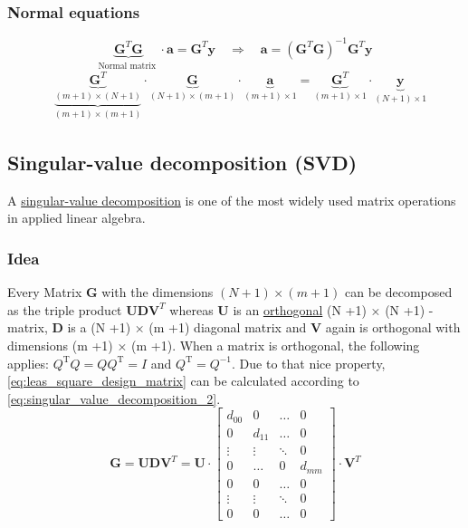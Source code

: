 \subsubsection{Normal equations}
\begin{equation}\label{eq:least_square_g}
\underbrace{\boldsymbol{G}^{T} \boldsymbol{G}}_{\text {Normal matrix }} \cdot \boldsymbol{a}=\boldsymbol{G}^{T} \boldsymbol{y} \quad \Rightarrow \quad \boldsymbol{a}=\left(\boldsymbol{G}^{T} \boldsymbol{G}\right)^{-1} \boldsymbol{G}^{T} \boldsymbol{y}
\end{equation}
$$
\begin{aligned}
& \underbrace{\underbrace{\boldsymbol{G}^{T}}_{(m+1) \times(N+1)}}_{(m+1) \times(m+1)} \cdot \underbrace{\boldsymbol{G}}_{(N+1) \times(m+1)} \cdot \underbrace{\boldsymbol{a}}_{(m+1) \times 1}=\underbrace{\boldsymbol{G}^{T}}_{(m+1) \times 1} \cdot \underbrace{\boldsymbol{y}}_{(N+1) \times 1}
\end{aligned}
$$
\subsection{Singular-value decomposition (SVD)}
A \href{https://en.wikipedia.org/wiki/Singular_value_decomposition}{singular-value decomposition} is one of the most widely used matrix operations in applied linear algebra.
\subsubsection{Idea}
Every Matrix $\boldsymbol{G}$ with the dimensions $(N+1) \times(m+1)$ can be decomposed as the triple product $\boldsymbol{U} \boldsymbol{D} \boldsymbol{V}^{T}$ whereas $\boldsymbol{U}$ is an \href{https://en.wikipedia.org/wiki/Orthogonal_matrix}{orthogonal} (N +1) × (N +1) -matrix, $\boldsymbol{D}$ is a (N +1) × (m +1) diagonal matrix and $\boldsymbol{V}$ again is orthogonal with dimensions (m +1) × (m +1). When a matrix is orthogonal, the following applies: $Q^{\mathrm{T}} Q=Q Q^{\mathrm{T}}=I$ and $Q^{\mathrm{T}}=Q^{-1}$. Due to that nice property, \autoref{eq:leas_square_design_matrix} can be calculated according to \autoref{eq:singular_value_decomposition_2}.
\begin{equation}\label{eq:singular_value_decomposition}
\boldsymbol{G}=\boldsymbol{U} \boldsymbol{D} \boldsymbol{V}^{T}=\boldsymbol{U} \cdot\left[\begin{array}{cccc}
d_{00} & 0 & \ldots & 0 \\
0 & d_{11} & \ldots & 0 \\
\vdots & \vdots & \ddots & 0 \\
0 & \ldots & 0 & d_{m m} \\
0 & 0 & \ldots & 0 \\
\vdots & \vdots & \ddots & 0 \\
0 & 0 & \ldots & 0
\end{array}\right] \cdot \boldsymbol{V}^{T}
\end{equation}


